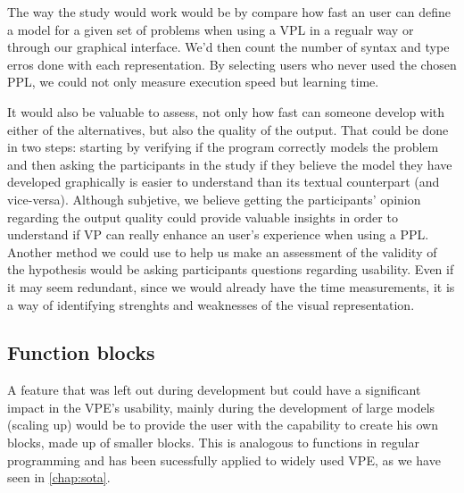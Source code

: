 The way the study would work would be by compare how fast an user can define a model for a given set of problems
when using a VPL in a regualr way or through our graphical interface. We'd then
count the number of syntax and type erros done with each representation. By
selecting users who never used the chosen PPL, we could not only measure execution
speed but learning time.

It would also be valuable to assess, not only how fast can someone develop with either
of the alternatives, but also the quality of the output. That could be done in two
steps: starting by verifying if the program correctly models the problem and then
asking the participants in the study if they believe the model they
have developed graphically is easier to understand than its textual counterpart (and
vice-versa).
Although subjetive, we believe getting the participants' opinion
regarding the output quality could provide valuable insights in order to understand if VP can
really enhance an user's experience when using a PPL. Another method we could use
to help us make an assessment of the validity of the hypothesis would be asking
participants questions regarding usability. Even if it may seem redundant, since
we would already have the time measurements, it is a way of identifying strenghts and
weaknesses of the visual representation.

\subsection{Function blocks}

A feature that was left out during development but could have a significant
impact in the VPE's usability, mainly during the development of large models
(scaling up) would be to provide the user with the capability to create his own
blocks, made up of smaller blocks. This is analogous to functions in regular
programming and has been sucessfully applied to widely used VPE, as we have
seen in \ref{chap:sota}.

